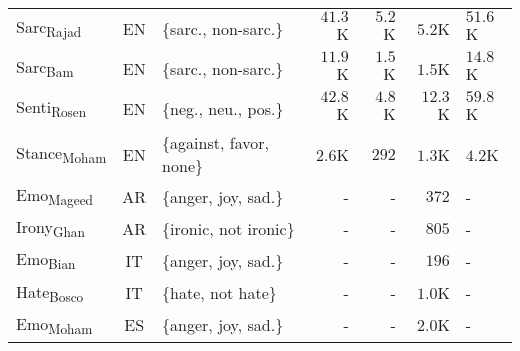 \begin{table}[h]
{\begin{tabular}{@{}lclrrrH@{}}
Sarc\textsubscript{Rajad}%
& EN &   \{sarc., non-sarc.\}                                                               & $41.3$K                            & $5.2$K                          & $5.2$K                           & $51.6$K                          \\
Sarc\textsubscript{Bam}%
& EN &          \{sarc., non-sarc.\}                                                        & $11.9$K                             & $1.5$K                          & $1.5$K                             & $14.8$K                             \\
Senti\textsubscript{Rosen}%
& EN & \{neg., neu., pos.\}                                 & $42.8$K                            & $4.8$K                           & $12.3$K                         & $59.8$K                           \\
Stance\textsubscript{Moham}%
& EN & \{against, favor, none\}                                        & $2.6$K                              & $292$                              & $1.3$K                             & $4.2$K                             \\ 
Emo\textsubscript{Mageed}%
& AR & \{anger, joy, sad.\}                                        & -                              & -                              & $372$                             & -                             \\
Irony\textsubscript{Ghan}%
& AR & \{ironic, not ironic\}                                        & -                              & -                              & $805$                             & -                             \\
Emo\textsubscript{Bian}%
& IT & \{anger, joy, sad.\}                                        & -                              & -                              & $196$                             & -                             \\
Hate\textsubscript{Bosco}%
& IT & \{hate, not hate\}                                        & -                              & -                              & $1.0$K                             & -                            \\
Emo\textsubscript{Moham}%
& ES & \{anger, joy, sad.\}                                        & -                              & -                             & $2.0$K                             & -                             \\

\end{tabular}}
\end{table}
